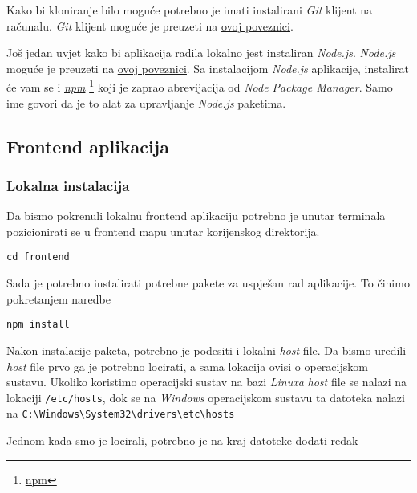 		    Kako bi kloniranje bilo moguće potrebno je imati instalirani \textit{Git} klijent na računalu. \textit{Git} klijent moguće je preuzeti na \underline{\href{https://git-scm.com/downloads}{ovoj poveznici}}.
		    
		    Još jedan uvjet kako bi aplikacija radila lokalno jest instaliran \textit{Node.js}. \textit{Node.js} moguće je preuzeti na \underline{\href{https://nodejs.org/en/download/}{ovoj poveznici}}. Sa instalacijom \textit{Node.js} aplikacije, instalirat će vam se i \textit{\underline{npm}} \footnote{\href{https://www.npmjs.com/}{npm}} koji je zaprao abrevijacija od \textit{Node Package Manager}. Samo ime govori da je to alat za upravljanje \textit{Node.js} paketima.

		        
				\pagebreak
		

				\subsection{Frontend aplikacija}
	        
						\subsubsection*{Lokalna instalacija}
	        
	          		Da bismo pokrenuli lokalnu frontend aplikaciju potrebno je unutar terminala pozicionirati se u frontend mapu unutar korijenskog direktorija. 
	            
								\begin{center}
										\texttt{cd frontend}
								\end{center}
								
								Sada je potrebno instalirati potrebne pakete za uspješan rad aplikacije. To činimo pokretanjem naredbe
								
								\begin{center}
										\texttt{npm install}
								\end{center}
								
								Nakon instalacije paketa, potrebno je podesiti i lokalni \textit{host} file. Da bismo uredili \textit{host} file prvo ga je potrebno locirati, a sama lokacija ovisi o operacijskom sustavu. Ukoliko koristimo operacijski sustav na bazi \textit{Linuxa} \textit{host} file se nalazi na lokaciji \texttt{/etc/hosts}, dok se na \textit{Windows} operacijskom sustavu ta datoteka nalazi na \verb$C:\Windows\System32\drivers\etc\hosts$
								
								Jednom kada smo je locirali, potrebno je na kraj datoteke dodati redak

